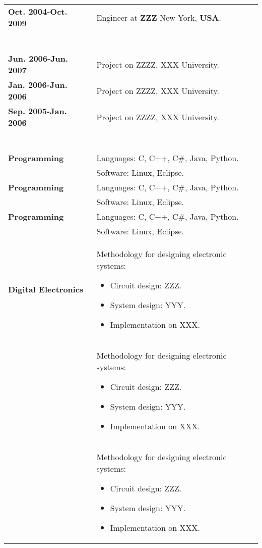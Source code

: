 \documentclass[twoside,a4paper,openright,10pt]{report}
\newcommand{\header}[1]{\multicolumn{2}{c}{\cellcolor{black} \textcolor{white}{#1}}\\}
\begin{document}
\begin{table}[ht]
\begin{tabular}{p{40mm} p{140mm}}
\textbf{Oct. 2004-Oct. 2009} & Engineer at \textbf{ZZZ} New York, \textbf{USA}.\\

\\

\header{University Experience} \\

\textbf{Jun. 2006-Jun. 2007} & Project on ZZZZ, XXX University.\\
\textbf{Jan. 2006-Jun. 2006} & Project on ZZZZ, XXX University.\\
\textbf{Sep. 2005-Jan. 2006} & Project on ZZZZ, XXX University.\\

\\
\header{Skills} \\

\textbf{Programming} & Languages: C, C++, C\#, Java, Python.\\
& Software: Linux, Eclipse.\\

\textbf{Programming} & Languages: C, C++, C\#, Java, Python.\\
& Software: Linux, Eclipse.\\

\textbf{Programming} & Languages: C, C++, C\#, Java, Python.\\
& Software: Linux, Eclipse.\\

\textbf{Digital Electronics} & Methodology for designing electronic systems:
\begin{itemize}[noitemsep,nolistsep]
\item Circuit design: ZZZ.
\item System design: YYY.
\item Implementation on XXX.
\end{itemize}\\
& \vspace{-7mm} Methodology for designing electronic systems:
\begin{itemize}[noitemsep,nolistsep]
\item Circuit design: ZZZ.
\item System design: YYY.
\item Implementation on XXX.
\vspace{-4mm}
\end{itemize}\\
& Methodology for designing electronic systems:
\begin{itemize}[noitemsep,nolistsep]
\item Circuit design: ZZZ.
\item System design: YYY.
\item Implementation on XXX.
\vspace{-4mm}
\end{itemize}\\


\end{tabular}
\end{table}
\end{document}
